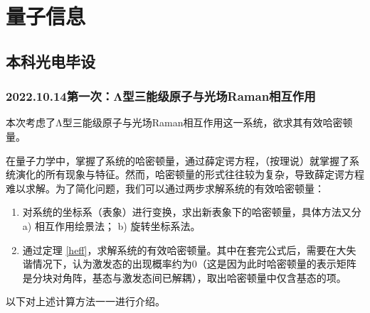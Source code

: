 \documentclass[
fontsetup = font-setup-open.tex,
titlesetup = titles-setup.tex
]{AJbook}
\numberwithin{equation}{section}
\begin{document}
\frontmatter	%

\mainmatter		%

\part{量子信息}
\chapter{本科光电毕设}
\section[2022.10.14第一次]{2022.10.14第一次：Λ型三能级原子与光场Raman相互作用}
本次考虑了Λ型三能级原子与光场Raman相互作用这一系统，欲求其有效哈密顿量。

在量子力学中，掌握了系统的哈密顿量，通过薛定谔方程，（按理说）就掌握了系统演化的所有现象与特征。然而，哈密顿量的形式往往较为复杂，导致薛定谔方程难以求解。为了简化问题，我们可以通过两步求解系统的有效哈密顿量：
\begin{enumerate}
\item 对系统的坐标系（表象）进行变换，求出新表象下的哈密顿量，具体方法又分 a) 相互作用绘景法； b) 旋转坐标系法。
\item 通过定理 \ref{heff}，求解系统的有效哈密顿量。其中在套完公式后，需要在大失谐情况下，认为激发态的出现概率约为0（这是因为此时哈密顿量的表示矩阵是分块对角阵，基态与激发态间已解耦），取出哈密顿量中仅含基态的项。
\end{enumerate}

以下对上述计算方法一一进行介绍。
\end{document}
